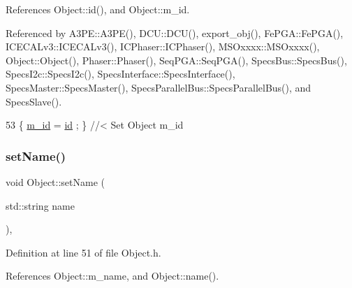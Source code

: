 References Object\+::id(), and Object\+::m\+\_\+id.



Referenced by A3\+P\+E\+::\+A3\+P\+E(), D\+C\+U\+::\+D\+C\+U(), export\+\_\+obj(), Fe\+P\+G\+A\+::\+Fe\+P\+G\+A(), I\+C\+E\+C\+A\+Lv3\+::\+I\+C\+E\+C\+A\+Lv3(), I\+C\+Phaser\+::\+I\+C\+Phaser(), M\+S\+Oxxxx\+::\+M\+S\+Oxxxx(), Object\+::\+Object(), Phaser\+::\+Phaser(), Seq\+P\+G\+A\+::\+Seq\+P\+G\+A(), Specs\+Bus\+::\+Specs\+Bus(), Specs\+I2c\+::\+Specs\+I2c(), Specs\+Interface\+::\+Specs\+Interface(), Specs\+Master\+::\+Specs\+Master(), Specs\+Parallel\+Bus\+::\+Specs\+Parallel\+Bus(), and Specs\+Slave().


\begin{DoxyCode}
53 \{ \hyperlink{classObject_aca74b9dbfed7b5556ea2d56c65b6b6b0}{m\_id}    = \hyperlink{classObject_af99145335cc61ff6e2798ea17db009d2}{id}    ; \} \textcolor{comment}{//< Set Object m\_id}
\end{DoxyCode}
\mbox{\label{classObject_ae30fea75683c2d149b6b6d17c09ecd0c}} 
\subsubsection{\texorpdfstring{set\+Name()}{setName()}}
{\footnotesize\ttfamily void Object\+::set\+Name (\begin{DoxyParamCaption}\item[{std\+::string}]{name }\end{DoxyParamCaption})\hspace{0.3cm}{\ttfamily [inline]}, {\ttfamily [inherited]}}



Definition at line 51 of file Object.\+h.



References Object\+::m\+\_\+name, and Object\+::name().



